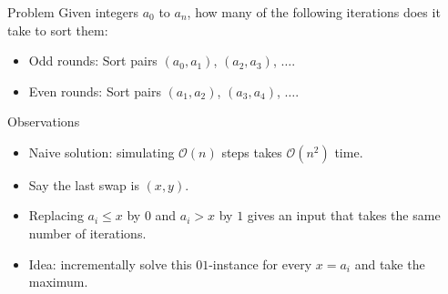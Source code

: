 \begin{frame}
    \frametitle{\problemtitle}
    \begin{block}{Problem}
      Given integers $a_0$ to $a_n$, how many of the following iterations does it take to sort
      them:
      \begin{itemize}
        \item Odd rounds: Sort pairs $(a_0, a_1)$, $(a_2, a_3)$, $\dots$.
        \item Even rounds: Sort pairs $(a_1, a_2)$, $(a_3, a_4)$, $\dots$.
      \end{itemize}
    \end{block}
    \pause
    \begin{block}{Observations}
        \begin{itemize}
            \item<+-> Naive solution: simulating $\mathcal O(n)$ steps takes
                $\mathcal O(n^2)$ time.
            \item<+-> Say the last swap is $(x, y)$.
            \item<+-> Replacing $a_i \leq x$ by $0$ and $a_i > x$ by $1$
                gives an input that takes the same number of iterations.
            \item<+-> Idea: incrementally solve this $01$-instance for every $x=a_i$ and take the maximum.
        \end{itemize}
    \end{block}
    \solvestats
\end{frame}

